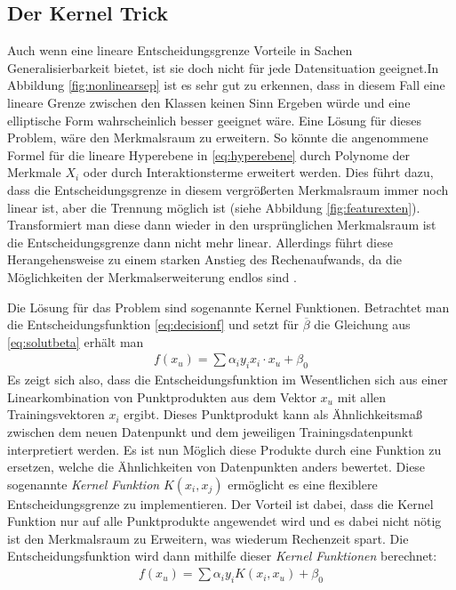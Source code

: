 \documentclass[
]{article}
\begin{document}
\subsection{Der Kernel Trick}

Auch wenn eine lineare Entscheidungsgrenze Vorteile in Sachen
Generalisierbarkeit bietet, ist sie doch nicht für jede Datensituation
geeignet.In Abbildung \ref{fig:nonlinearsep} ist es sehr gut zu
erkennen, dass in diesem Fall eine lineare Grenze zwischen den Klassen
keinen Sinn Ergeben würde und eine elliptische Form wahrscheinlich
besser geeignet wäre. Eine Lösung für dieses Problem, wäre den
Merkmalsraum zu erweitern. So könnte die angenommene Formel für die
lineare Hyperebene in \eqref{eq:hyperebene} durch Polynome der Merkmale
\(X_i\) oder durch Interaktionsterme erweitert werden. Dies führt dazu,
dass die Entscheidungsgrenze in diesem vergrößerten Merkmalsraum immer
noch linear ist, aber die Trennung möglich ist (siehe Abbildung
\ref{fig:featurexten}). Transformiert man diese dann wieder in den
ursprünglichen Merkmalsraum ist die Entscheidungsgrenze dann nicht mehr
linear. Allerdings führt diese Herangehensweise zu einem starken Anstieg
des Rechenaufwands, da die Möglichkeiten der Merkmalserweiterung endlos
sind \parencite{jamesIntroductionStatisticalLearning2021}.

Die Lösung für das Problem sind sogenannte Kernel Funktionen. Betrachtet
man die Entscheidungsfunktion \eqref{eq:decisionf} und setzt für
\(\overline{\beta}\) die Gleichung aus \eqref{eq:solutbeta} erhält man
\begin{align}
f(x_u)= \sum \alpha_i y_i x_i \cdot x_u +\beta_0
\end{align} Es zeigt sich also, dass die Entscheidungsfunktion im
Wesentlichen sich aus einer Linearkombination von Punktprodukten aus dem
Vektor \(x_u\) mit allen Trainingsvektoren \(x_i\) ergibt. Dieses
Punktprodukt kann als Ähnlichkeitsmaß zwischen dem neuen Datenpunkt und
dem jeweiligen Trainingsdatenpunkt interpretiert werden. Es ist nun
Möglich diese Produkte durch eine Funktion zu ersetzen, welche die
Ähnlichkeiten von Datenpunkten anders bewertet. Diese sogenannte
\textit{Kernel Funktion} \(K(x_i,x_j)\) ermöglicht es eine flexiblere
Entscheidungsgrenze zu implementieren. Der Vorteil ist dabei, dass die
Kernel Funktion nur auf alle Punktprodukte angewendet wird und es dabei
nicht nötig ist den Merkmalsraum zu Erweitern, was wiederum Rechenzeit
spart\parencite{jamesIntroductionStatisticalLearning2021}. Die
Entscheidungsfunktion wird dann mithilfe dieser
\textit{Kernel Funktionen} berechnet: \begin{align}
  f(x_u)=\sum \alpha_i y_i K(x_i,x_u)+\beta_0
\end{align}
\end{document}
